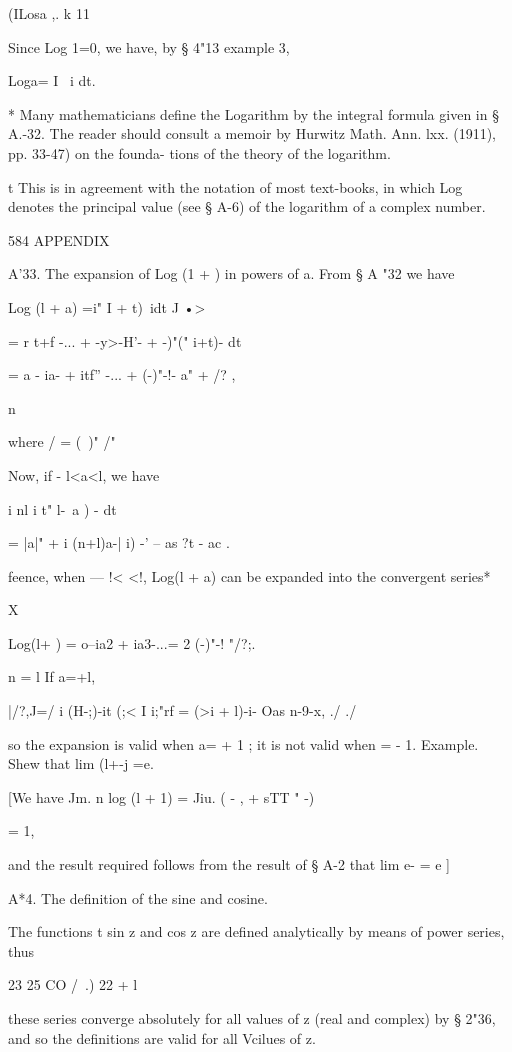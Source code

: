 (ILosa ,. k 11 

Since Log 1=0, we have, by § 4"13 example 3, 

Loga= I  ~i dt. 

* Many mathematicians define the Logarithm by the integral formula given in § A.-32. The 
reader should consult a memoir by Hurwitz  Math. Ann. lxx. (1911), pp. 33-47) on the founda- 
tions of the theory of the logarithm. 

t This is in agreement with the notation of most text-books, in which Log denotes the 
principal value (see § A-6) of the logarithm of a complex number. 



584 APPENDIX 

A'33. The expansion of Log (1 + ) in powers of a. 
From § A "32 we have 

Log (l + a) =i"  I + t)~idt 
J •> 

= r  t+f  -... +  -y>-H'-  +  -)"("  i+t)-  dt 

= a - ia- + itf'' -... + (-)"-!- a" + /?  , 

n 

where /   = (\ )" /"%

Now, if - l<a<l, we have 

i nl i t" l-\ a ) - dt 

= |a|" + i (n+l)a-| i) -' 
--  as ?t -  ac . 

feence, when — !< <!, Log(l + a) can be expanded into the convergent series* 

X 

Log(l+ ) = o--ia2 + ia3-...= 2 (-)"-! "/?;. 

n = l 
If a=+l, 

|/?,J=/ i (H-;)-it (;< I i;"rf  = (>i + l)-i- Oas n-9-x, 
./ ./ 

so the expansion is valid when a= + 1 ; it is not valid when  = - 1. 
Example. Shew that lim (l+-j =e. 

[We have Jm.  n log (l + 1) = Jiu.  (  -  , + sTT  " -) 

= 1, 

and the result required follows from the result of § A-2 that lim e- = e ] 

A*4. The definition of the sine and cosine. 

The functions t sin z and cos z are defined analytically by means of power series, thus 

23 25   CO /\ .) 22  + l 

these series converge absolutely for all values of z (real and complex) by § 2"36, and so the 
definitions are valid for all Vcilues of z. 

